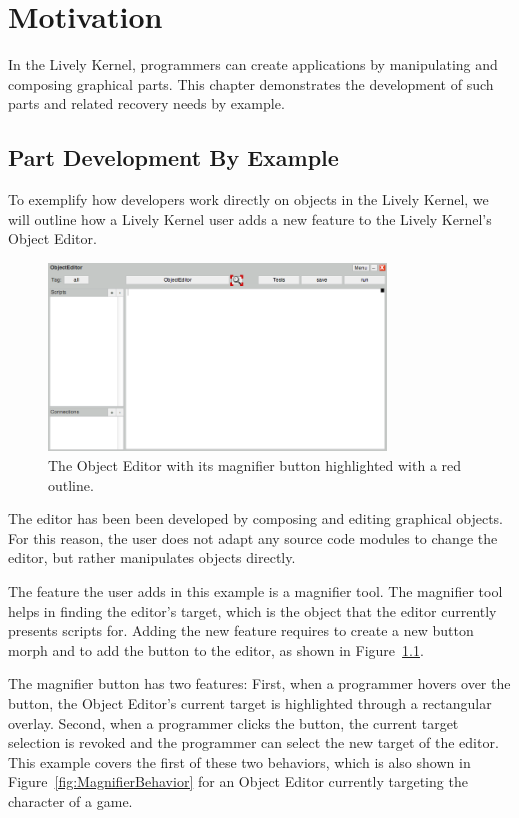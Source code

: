 \chapter{Motivation} \label{chapter:MOTIVATION}

In the Lively Kernel, programmers can create applications by manipulating and composing graphical parts.
This chapter demonstrates the development of such parts and related recovery needs by example.


\section{Part Development By Example}

To exemplify how developers work directly on objects in the Lively Kernel, we will outline how a Lively Kernel user adds a new feature to the Lively Kernel's Object Editor.

\begin{figure}[h]
    \centering
    \includegraphics[width=0.8\textwidth]{figures/3_motivation/1_magnifierButton.png}
    \caption{The Object Editor with its magnifier button highlighted with a red outline.}
    \label{fig:MagnifierButton}
\end{figure}

The editor has been been developed by composing and editing graphical objects.
For this reason, the user does not adapt any source code modules to change the editor, but rather manipulates objects directly.

The feature the user adds in this example is a magnifier tool.
The magnifier tool helps in finding the editor's target, which is the object that the editor currently presents scripts for.
Adding the new feature requires to create a new button morph and to add the button to the editor, as shown in Figure~\ref{fig:MagnifierButton}.

The magnifier button has two features: First, when a programmer hovers over the button, the Object Editor's current target is highlighted through a rectangular overlay. Second, when a programmer clicks the button, the current target selection is revoked and the programmer can select the new target of the editor.
This example covers the first of these two behaviors, which is also shown in Figure~\ref{fig:MagnifierBehavior} for an Object Editor currently targeting the character of a game.

